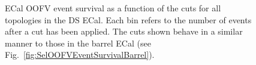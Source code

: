 \begin{figure}
\begin{minipage}{.5\linewidth}
\end{minipage}%
\begin{minipage}{.5\linewidth}
\centering
{}
\end{minipage}\par\medskip
\caption{ECal OOFV event survival as a function of the cuts for all topologies in the DS ECal.  Each bin refers to the number of events after a cut has been applied.  The cuts shown behave in a similar manner to those in the barrel ECal (see Fig.~\ref{fig:SelOOFVEventSurvivalBarrel}).}
\label{fig:SelOOFVEventSurvivalDS}
\end{figure}
\newline
\newline
